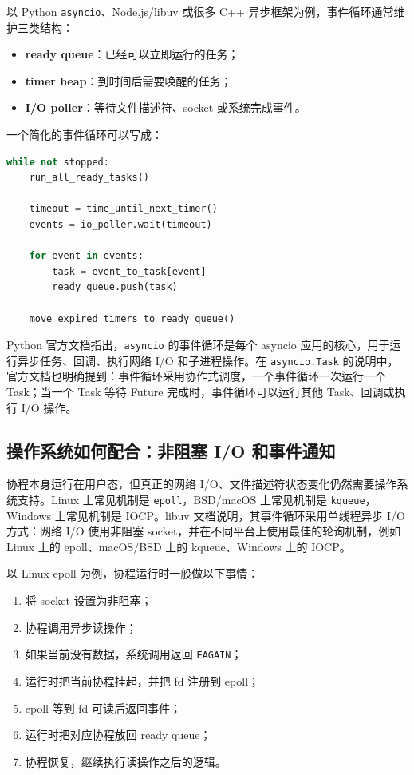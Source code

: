 \documentclass[UTF8,zihao=-4]{ctexart}
\begin{document}
以 Python \texttt{asyncio}、Node.js/libuv 或很多 C++ 异步框架为例，事件循环通常维护三类结构：

\begin{itemize}
  \item \textbf{ready queue}：已经可以立即运行的任务；
  \item \textbf{timer heap}：到时间后需要唤醒的任务；
  \item \textbf{I/O poller}：等待文件描述符、socket 或系统完成事件。
\end{itemize}

一个简化的事件循环可以写成：

\begin{lstlisting}[language=Python,caption={简化事件循环伪代码}]
while not stopped:
    run_all_ready_tasks()

    timeout = time_until_next_timer()
    events = io_poller.wait(timeout)

    for event in events:
        task = event_to_task[event]
        ready_queue.push(task)

    move_expired_timers_to_ready_queue()
\end{lstlisting}

Python 官方文档指出，\texttt{asyncio} 的事件循环是每个 asyncio 应用的核心，用于运行异步任务、回调、执行网络 I/O 和子进程操作\cite{asyncio-eventloop}。在 \texttt{asyncio.Task} 的说明中，官方文档也明确提到：事件循环采用协作式调度，一个事件循环一次运行一个 Task；当一个 Task 等待 Future 完成时，事件循环可以运行其他 Task、回调或执行 I/O 操作\cite{asyncio-task}。

\subsection{操作系统如何配合：非阻塞 I/O 和事件通知}

协程本身运行在用户态，但真正的网络 I/O、文件描述符状态变化仍然需要操作系统支持。Linux 上常见机制是 \texttt{epoll}，BSD/macOS 上常见机制是 \texttt{kqueue}，Windows 上常见机制是 IOCP。libuv 文档说明，其事件循环采用单线程异步 I/O 方式：网络 I/O 使用非阻塞 socket，并在不同平台上使用最佳的轮询机制，例如 Linux 上的 epoll、macOS/BSD 上的 kqueue、Windows 上的 IOCP\cite{libuv}。

以 Linux epoll 为例，协程运行时一般做以下事情：

\begin{enumerate}
  \item 将 socket 设置为非阻塞；
  \item 协程调用异步读操作；
  \item 如果当前没有数据，系统调用返回 \texttt{EAGAIN}；
  \item 运行时把当前协程挂起，并把 fd 注册到 epoll；
  \item epoll 等到 fd 可读后返回事件；
  \item 运行时把对应协程放回 ready queue；
  \item 协程恢复，继续执行读操作之后的逻辑。
\end{enumerate}
\end{document}
